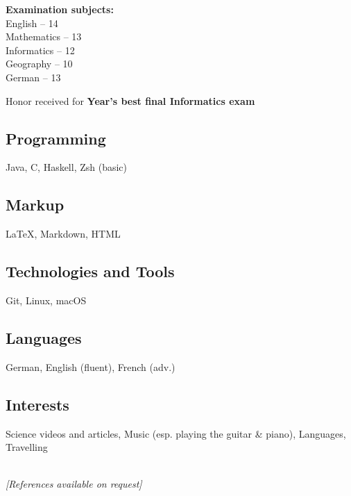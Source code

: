 \documentclass[]{jonas-cv}
\begin{document}
\begin{minipage}[t]{0.34\textwidth}
\begin{tightemize}
    \item \textbf{Examination subjects:}\\
             English -- 14 \\
             Mathematics -- 13\\
             Informatics -- 12\\
             Geography -- 10\\
             German -- 13
    \item Honor received for \textbf{Year's best final Informatics exam}
\end{tightemize}
\largesectionsep


\subsection{Programming}
Java, C, Haskell, Zsh (basic)\\
\tinysectionsep

\subsection{Markup}
\LaTeX, Markdown, HTML\\
\tinysectionsep

\subsection{Technologies and Tools}
Git, Linux, macOS\\
\tinysectionsep

\subsection{Languages}
German, English (fluent), French (adv.)

\largesectionsep

\subsection{Interests}
Science videos and articles, Music (esp. playing the guitar \& piano), Languages, Travelling

\ \\
\vspace{24mm}
\small \textit{[References available on request]}

%
%

\end{minipage} 
\end{document}
